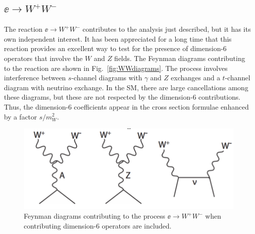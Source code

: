 \subsection{$\ee \to W^+W^-$}

The reaction $\ee\to W^+W^-$ contributes to the analysis just described, but it has its own independent interest.  It has been appreciated for  a long time that this reaction provides an excellent way to test for the presence of dimension-6 operators that involve the $W$ and $Z$ fields.   The Feynman diagrams contributing to the reaction are shown in Fig.~\ref{fig:WWdiagrams}.   The process involves interference between $s$-channel diagrams with $\gamma$ and $Z$ exchanges and a $t$-channel diagram with neutrino exchange.  In the SM, there are large cancellations among these diagrams, but these are not respected by the dimension-6 contributions.   Thus, the dimension-6 coefficients appear in the cross section formulae enhanced by a factor $s/m_W^2$. 

\begin{figure}
\begin{center}
\includegraphics[width=0.80\hsize]{chapters/figures/WWdiagrams.pdf}
\end{center}
\caption{Feynman diagrams contributing to the process $\ee\to W^+W^-$ when contributing  dimension-6 operators are included.}
\label{fig:eeWWdiagrams}
\end{figure}

